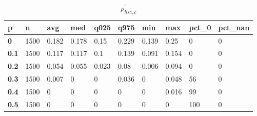 \begin{table}[h]
 \centering 
\footnotesize
\caption{$\rho_{hsc,c}^\prime $}
\label{tab:alphahscc}
\begin{tabular}[h]{|l|l|l|l|l|l|l|l|l|l|
    } \hline
\textbf{ p} & \textbf{ n} & \textbf{ avg} & \textbf{ med} & \textbf{ q025} & \textbf{ q975} & \textbf{ min} & \textbf{ max} & \textbf{ pct\_0} & \textbf{ pct\_nan}
    \\ \hline
  \textbf{  0} & 1500 & 0.182 & 0.178 &  0.15 & 0.229 & 0.139 &  0.25 &   0 & 0
    \\ \hline
  \textbf{0.1} & 1500 & 0.117 & 0.117 &   0.1 & 0.139 & 0.091 & 0.154 &   0 & 0
    \\ \hline
  \textbf{0.2} & 1500 & 0.054 & 0.055 & 0.023 &  0.08 & 0.006 & 0.094 &   0 & 0
    \\ \hline
  \textbf{0.3} & 1500 & 0.007 &     0 &     0 & 0.036 &     0 & 0.048 &  56 & 0
    \\ \hline
  \textbf{0.4} & 1500 &     0 &     0 &     0 &     0 &     0 & 0.016 &  99 & 0
    \\ \hline
  \textbf{0.5} & 1500 &     0 &     0 &     0 &     0 &     0 &     0 & 100 & 0
    \\ \hline
 \end{tabular}
 \end{table}
